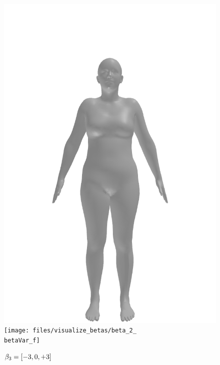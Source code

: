 \begin{figure}[ht!]
\begin{minipage}[b]{\textwidth}
        \includegraphics[width=\imgWidth]{files/visualize_betas/baseline_f}
        \texttt{[image: files/visualize\_betas/beta\_2\_\\betaVar\_f]}
        \caption{$\beta_3 = [-3, 0, +3]$}
    \end{minipage}
\end{figure}

